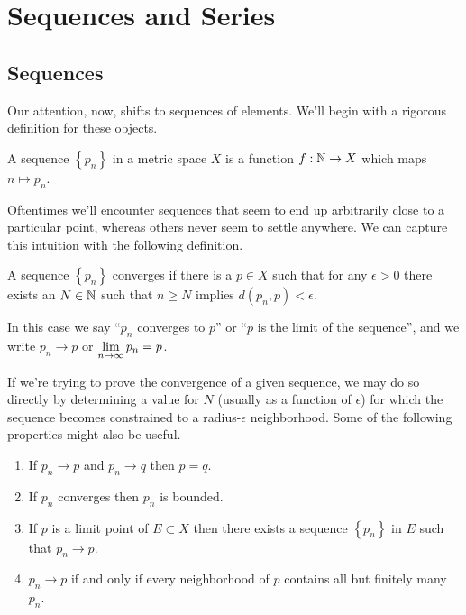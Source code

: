 \documentclass[../m131main.tex]{subfiles}
\begin{document}
\chapter{Sequences and Series} \label{ch:seqser}
\section{Sequences}
Our attention, now, shifts to sequences of elements.
We'll begin with a rigorous definition for these objects.

\begin{definition}[Sequence]
    A sequence $\left\{ p_n \right\}$ in a metric space $X$ is a function $f : \mathbb{N} \to X$ which maps $n \mapsto p_n$.
\end{definition}

Oftentimes we'll encounter sequences that seem to end up arbitrarily close to a particular point, whereas others never seem to settle anywhere.
We can capture this intuition with the following definition.

\begin{definition}[Convergence]
    A sequence $\left\{ p_n \right\}$ converges if there is a $p \in X$ such that for any $\epsilon > 0$ there exists an $N \in \mathbb{N}$ such that $n \geq N$ implies $d(p_n, p) < \epsilon$.
\end{definition}

In this case we say ``$p_n$ converges to $p$'' or ``$p$ is the limit of the sequence'', and we write $p_n \to p$ or $\displaystyle \lim_{n \to \infty} p_n = p$.

\vspace{-3pt}
If we're trying to prove the convergence of a given sequence, we may do so directly by determining a value for $N$ (usually as a function of $\epsilon$) for which the sequence becomes constrained to a radius-$\epsilon$ neighborhood.
Some of the following properties might also be useful.

\begin{theorem}
    \begin{enumerate}[label=(\alph*)]
        \item If $p_n \to p$ and $p_n \to q$ then $p = q$.
        \item If $p_n$ converges then $p_n$ is bounded.
        \item If $p$ is a limit point of $E \subset X$ then there exists a sequence $\left\{ p_n \right\}$ in $E$ such that $p_n \to p$.
        \item $p_n \to p$ if and only if every neighborhood of $p$ contains all but finitely many $p_n$.
    \end{enumerate}
\end{theorem}
\end{document}
